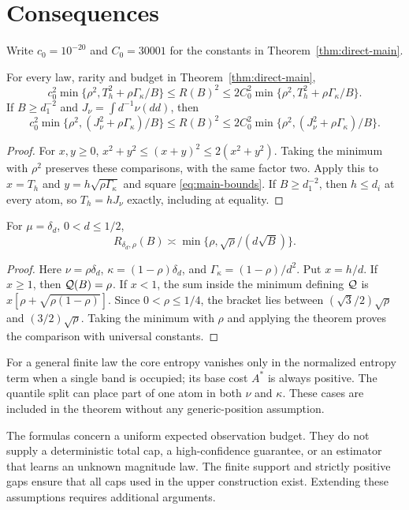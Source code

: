 \section{Consequences}\label{sec:consequences}
Write $c_0=10^{-20}$ and $C_0=30001$ for the constants in
Theorem~\ref{thm:direct-main}.

\begin{corollary}\label{cor:mse}
For every law, rarity and budget in Theorem~\ref{thm:direct-main},
\[
 c_0^2\min\{\rho^2,T_h^2+\rho\Gamma_\kappa/B\}
 \le R(B)^2
 \le2C_0^2\min\{\rho^2,T_h^2+\rho\Gamma_\kappa/B\}.
\]
If $B\ge d_1^{-2}$ and $J_\nu=\int d^{-1}\nu(dd)$, then
\[
 c_0^2\min\{\rho^2,(J_\nu^2+\rho\Gamma_\kappa)/B\}
 \le R(B)^2
 \le2C_0^2\min\{\rho^2,(J_\nu^2+\rho\Gamma_\kappa)/B\}.
\]
\end{corollary}
\begin{proof}
For $x,y\ge0$, $x^2+y^2\le(x+y)^2\le2(x^2+y^2)$.
Taking the minimum with $\rho^2$ preserves these comparisons,
with the same factor two. Apply this to $x=T_h$ and
$y=h\sqrt{\rho\Gamma_\kappa}$ and square
\eqref{eq:main-bounds}. If $B\ge d_1^{-2}$, then $h\le d_i$
at every atom, so $T_h=hJ_\nu$ exactly, including at equality.
\end{proof}

\begin{corollary}\label{cor:one-gap}
For $\mu=\delta_d$, $0<d\le1/2$,
\[
 R_{\delta_d,\rho}(B)\asymp
       \min\{\rho,\sqrt{\rho}/(d\sqrt B)\}.
\]
\end{corollary}
\begin{proof}
Here $\nu=\rho\delta_d$, $\kappa=(1-\rho)\delta_d$, and
$\Gamma_\kappa=(1-\rho)/d^2$. Put $x=h/d$. If $x\ge1$,
then $\mathcal Q(B)=\rho$. If $x<1$, the sum inside the minimum
defining $\mathcal Q$ is $x[\rho+\sqrt{\rho(1-\rho)}]$.
Since $0<\rho\le1/4$, the bracket lies between
$(\sqrt3/2)\sqrt\rho$ and $(3/2)\sqrt\rho$.
Taking the minimum with $\rho$ and applying the theorem proves
the comparison with universal constants.
\end{proof}

For a general finite law the core entropy vanishes only in the
normalized entropy term when a single band is occupied; its base
cost $A^*$ is always positive. The quantile split can place part
of one atom in both $\nu$ and $\kappa$. These cases are included
in the theorem without any generic-position assumption.

The formulas concern a uniform expected observation budget.
They do not supply a deterministic total cap, a high-confidence
guarantee, or an estimator that learns an unknown magnitude law.
The finite support and strictly positive gaps ensure that all
caps used in the upper construction exist. Extending these
assumptions requires additional arguments.
